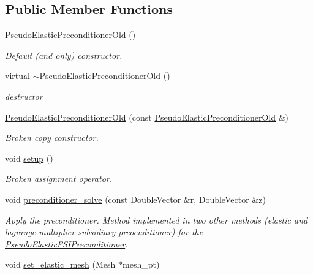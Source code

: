 \subsection*{Public Member Functions}
\begin{DoxyCompactItemize}
\item 
\hyperlink{classoomph_1_1PseudoElasticPreconditionerOld_a604bb3a8e087574657d28feee1cc2611}{Pseudo\+Elastic\+Preconditioner\+Old} ()
\begin{DoxyCompactList}\small\item\em Default (and only) constructor. \end{DoxyCompactList}\item 
virtual \hyperlink{classoomph_1_1PseudoElasticPreconditionerOld_a1e690693abc957640c99b63fe3c5c73f}{$\sim$\+Pseudo\+Elastic\+Preconditioner\+Old} ()
\begin{DoxyCompactList}\small\item\em destructor \end{DoxyCompactList}\item 
\hyperlink{classoomph_1_1PseudoElasticPreconditionerOld_a8186e3328b5b93186645812e79324843}{Pseudo\+Elastic\+Preconditioner\+Old} (const \hyperlink{classoomph_1_1PseudoElasticPreconditionerOld}{Pseudo\+Elastic\+Preconditioner\+Old} \&)
\begin{DoxyCompactList}\small\item\em Broken copy constructor. \end{DoxyCompactList}\item 
void \hyperlink{classoomph_1_1PseudoElasticPreconditionerOld_a25d542a5b98d70be1aa1dd6000402978}{setup} ()
\begin{DoxyCompactList}\small\item\em Broken assignment operator. \end{DoxyCompactList}\item 
void \hyperlink{classoomph_1_1PseudoElasticPreconditionerOld_a20b548d07e0f4116f59444ccb69d980f}{preconditioner\+\_\+solve} (const Double\+Vector \&r, Double\+Vector \&z)
\begin{DoxyCompactList}\small\item\em Apply the preconditioner. Method implemented in two other methods (elastic and lagrange multiplier subsidiary preocnditioner) for the \hyperlink{classoomph_1_1PseudoElasticFSIPreconditioner}{Pseudo\+Elastic\+F\+S\+I\+Preconditioner}. \end{DoxyCompactList}\item 
void \hyperlink{classoomph_1_1PseudoElasticPreconditionerOld_a96464001afad81606a6d298f4045de70}{set\+\_\+elastic\+\_\+mesh} (Mesh $\ast$mesh\+\_\+pt)

\end{DoxyCompactItemize}
